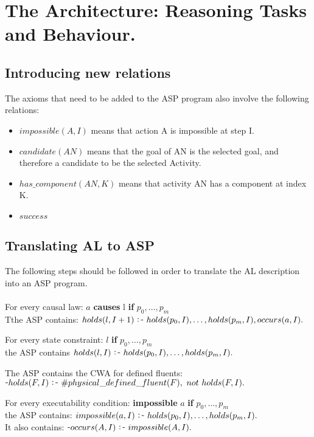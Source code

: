 \documentclass[11pt, oneside]{article}
\def\-{\raisebox{.75pt}{-}}
\def\:-{\raisebox{.75pt}{\ :\,-\ }}
\begin{document}
\section{The Architecture: Reasoning Tasks and Behaviour.} 
\subsection{Introducing new relations}
The axioms that need to be added to the ASP program also involve the following relations:
\begin{itemize}
\item $impossible(A, I)$ means that action A is impossible at step I.
\item $candidate(AN)$ means that the goal of AN is the selected goal, and therefore a candidate to be the selected Activity.
\item $has\_component(AN, K)$ means that activity AN has a component at index K.
\item $success$ 
\end{itemize}



\subsection{Translating AL to ASP}
The following steps should be followed in order to translate the AL description into an ASP program.\\
\\
For every causal law: $a$ \textbf{causes} l \textbf{if} $p_0, \dots, p_m$\\
Tthe ASP contains: $holds(l, I+1) \:- holds(p_0, I), \dots, holds(p_m, I), occurs(a, I).$\par

For every state constraint: $l$ \textbf{if} $p_0, \dots, p_m$\\
the ASP contains $holds(l, I) \:- holds(p_0, I), \dots, holds(p_m, I).$\par

The ASP contains the CWA for defined fluents:\\
$\-holds(F, I) \:- \#physical\_defined\_fluent(F),\ not\  holds(F, I).$\par

For every executability condition: \textbf{impossible} $a$ \textbf{if} $p_0, \dots, p_m$\\
the ASP contains: $impossible(a, I) \:- holds(p_0, I), \dots, holds(p_m, I).$\\
It also contains: $\-occurs(A, I) \:- impossible(A, I).$\par
\end{document}
